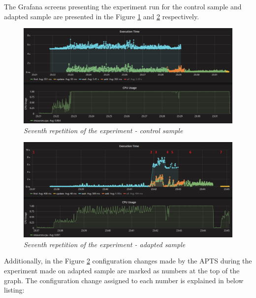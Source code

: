 \documentclass[12pt,a4paper]{article}
\begin{document}
The Grafana screens presenting the experiment run for the control sample and adapted sample are presented in the Figure \ref{figure:random:screen:control:7} and \ref{figure:random:screen:adapted:7} respectively. 

\begin{figure}[!htb]
\centering
\includegraphics[width=1\textwidth]{7-ctrl}
\caption{\textit{Seventh repetition of the experiment - control sample}} \label{figure:random:screen:control:7}
\end{figure}

\begin{figure}[!htb]
\centering
\includegraphics[width=1\textwidth]{7-adap}
\caption{\textit{Seventh repetition of the experiment - adapted sample}} \label{figure:random:screen:adapted:7}
\end{figure}


Additionally, in the Figure \ref{figure:random:screen:adapted:7} configuration changes made by the APTS during the experiment made on adapted sample are marked as numbers at the top of the graph. The configuration change assigned to each number is explained in below listing: 
\end{document}
